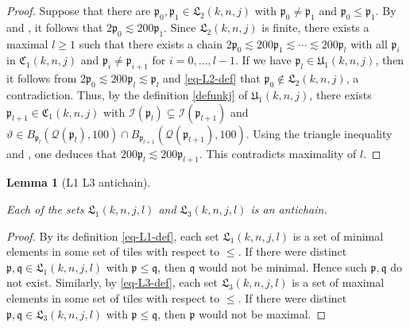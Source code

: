 \documentclass[10pt,a4paper]{article}
\theoremstyle{plain}
\newtheorem{lemma}[theorem]{Lemma}
\theoremstyle{definition}
\numberwithin{equation}{subsection}
\newcommand{\fp}{{\mathfrak p}}
\newcommand{\fU}{{\mathfrak U}}
\newcommand{\fq}{{\mathfrak q}}
\newcommand{\fL}{{\mathfrak L}}
\newcommand{\fC}{{\mathfrak C}}
\newcommand{\scI}{{\mathcal{I}}} %
\newcommand{\mfa}{{\vartheta}}
\newcommand{\fcc}{{\mathcal{Q}}}
\newcommand{\lean}[1]{}
\newcommand{\leanok}{}
\begin{document}
\begin{proof}
    \leanok
    Suppose that there are $\fp_0, \fp_1 \in \fL_2(k,n,j)$ with $\fp_0 \ne \fp_1$ and $\fp_0 \le \fp_1$. By  and , it follows that $2\fp_0 \lesssim 200\fp_1$. Since $\fL_2(k,n,j)$ is finite, there exists a maximal $l \ge 1$ such that there exists a chain $2\fp_0 \lesssim 200 \fp_1 \lesssim \dotsb \lesssim 200 \fp_l$ with all $\fp_i$ in $\fC_1(k,n,j)$ and $\fp_i \ne \fp_{i+1}$ for $i = 0, \dotsc, l-1$.
    If we have $\fp_l \in \fU_1(k,n,j)$, then it follows from $2\fp_0 \lesssim 200 \fp_l \lesssim \fp_l$ and \eqref{eq-L2-def} that $\fp_0 \not\in \fL_2(k,n,j)$, a contradiction. Thus, by the definition \eqref{defunkj} of $\fU_1(k,n,j)$, there exists $\fp_{l+1} \in \fC_1(k,n,j)$ with $\scI(\fp_l) \subsetneq \scI(\fp_{l+1}) $ and $\mfa \in B_{\fp_l}(\fcc(\fp_l), 100) \cap B_{\fp_{l+1}}(\fcc(\fp_{l+1}), 100)$. Using the triangle inequality and , one deduces that $200 \fp_l \lesssim 200\fp_{l+1}$. This contradicts maximality of $l$.
\end{proof}

\begin{lemma}[L1 L3 antichain]
\label{L1-L3-antichain}
\leanok
\lean{antichain_L1, antichain_L3}
    Each of the sets $\fL_1(k,n,j,l)$ and $\fL_3(k,n,j,l)$ is an antichain.
\end{lemma}

\begin{proof}
    \leanok
    By its definition \eqref{eq-L1-def}, each set $\fL_1(k,n,j,l)$ is a set of minimal elements in some set of tiles with respect to $\le$. If there were distinct $\fp, \fq \in \fL_1(k,n,j,l)$ with $\fp \le \fq$, then $\fq$ would not be minimal. Hence such $\fp, \fq$ do not exist. Similarly, by \eqref{eq-L3-def}, each set $\fL_3(k,n,j,l)$ is a set of maximal elements in some set of tiles with respect to $\le$. If there were distinct $\fp, \fq \in \fL_3(k,n,j,l)$ with $\fp \le \fq$, then $\fp$ would not be maximal.
\end{proof}
\end{document}
